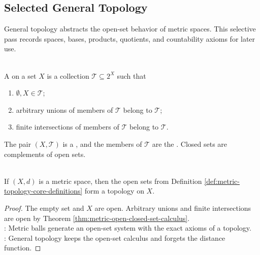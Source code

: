 \subsection{Selected General Topology}

%


General topology abstracts the open-set behavior of metric spaces. This selective pass records spaces, bases, products, quotients, and countability axioms for later use.

\begin{definition} \label{def:topological-space} \\
A  on a set $X$ is a collection $\mathcal{T}\subseteq 2^X$ such that
\begin{enumerate}[label=(\roman*)]
\setlength{\itemsep}{0pt}
\item $\emptyset,X\in\mathcal{T}$;
\item arbitrary unions of members of $\mathcal{T}$ belong to $\mathcal{T}$;
\item finite intersections of members of $\mathcal{T}$ belong to $\mathcal{T}$.
\end{enumerate}
The pair $(X,\mathcal{T})$ is a , and the members of $\mathcal{T}$ are the . Closed sets are complements of open sets.
\end{definition}

\begin{proposition} \label{prop:metric-open-sets-form-topology} \\
If $(X,d)$ is a metric space, then the open sets from Definition \ref{def:metric-topology-core-definitions} form a topology on $X$.
\begin{proof}
The empty set and $X$ are open. Arbitrary unions and finite intersections are open by Theorem \ref{thm:metric-open-closed-set-calculus}.\\
: Metric balls generate an open-set system with the exact axioms of a topology.\\
: General topology keeps the open-set calculus and forgets the distance function.
\end{proof}
\end{proposition}

